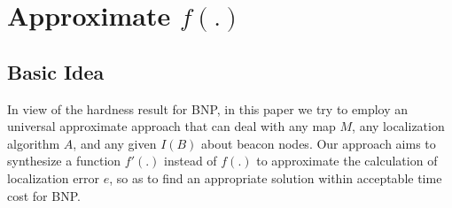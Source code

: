 \documentclass[10pt, conference, letterpaper]{IEEEtran}
\begin{document}
\section{Approximate $f(.)$} \label{approximate}

\subsection{Basic Idea} \label{basic idea}
In view of the hardness result for BNP, in this paper we try to employ an universal approximate approach that can deal with any map $M$, any localization algorithm $A$, and any given $I(B)$ about beacon nodes. Our approach aims to synthesize a function $f'(.)$ instead of $f(.)$ to approximate the calculation of localization error $e$, so as to find an appropriate solution within acceptable time cost for BNP.
\end{document}
